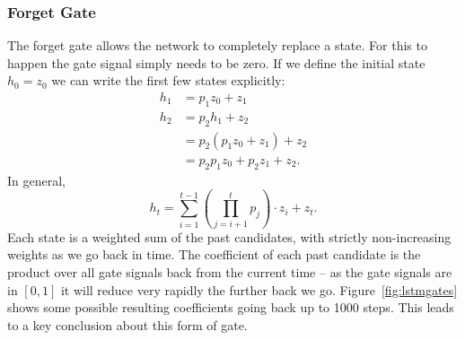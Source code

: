 \subsubsection{Forget Gate}
The forget gate allows the network to completely replace a state.
For this to happen the gate signal simply needs to be zero. If we define the initial
state \(h_0 = z_0\) we can write the first few states explicitly:
\begin{align}
	h_1 &= p_1z_0 + z_1 \\
	h_2 &= p_2h_1 + z_2 \\
		&= p_2(p_1z_0 + z_1) + z_2 \\
		&= p_2p_1z_0 + p_2z_1 + z_2.
\end{align} In general,
\begin{equation}
	h_t = \sum_{i=1}^{t-1} \left(\prod_{j=i+1}^t p_j\right) \cdot z_i + z_t.
\end{equation} Each state is a weighted sum of the past candidates, with strictly
non-increasing weights as we go back in time.
The coefficient of each past candidate is the product over all gate signals back from the
current time -- as the gate signals are in \([0, 1]\) it will reduce very rapidly the further
back we go.
Figure~\ref{fig:lstmgates} shows some possible resulting coefficients going back up to 1000 steps.
This leads to a key conclusion about this form of gate.


